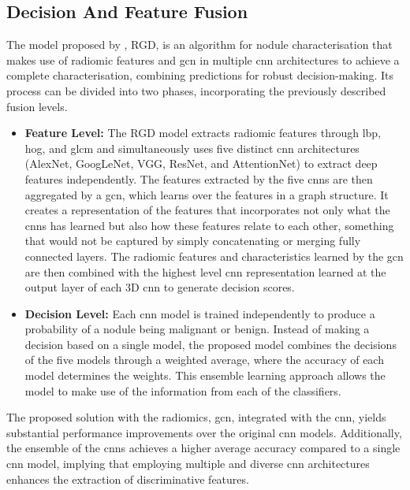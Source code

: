 \subsection{Decision And Feature Fusion}

The model proposed by \textcite{ma_novel_2023}, RGD, is an algorithm for nodule characterisation that makes use of radiomic features and \ac{gcn} in multiple \ac{cnn} architectures to achieve a complete characterisation, combining predictions for robust decision-making.
Its process can be divided into two phases, incorporating the previously described fusion levels.
\begin{itemize}
    \item \textbf{Feature Level:} The RGD model extracts radiomic features through \ac{lbp}, \ac{hog}, and \ac{glcm} and simultaneously uses five distinct \ac{cnn} architectures (AlexNet, GoogLeNet, VGG, ResNet, and AttentionNet) to extract deep features independently.
        The features extracted by the five \acp{cnn} are then aggregated by a  \ac{gcn}, which learns over the features in a graph structure. It creates a representation of the features that incorporates not only what the \acp{cnn} has learned but also how these features relate to each other, something that would not be captured by simply concatenating or merging fully connected layers.
    The radiomic features and characteristics learned by the \ac{gcn} are then combined with the highest level \ac{cnn} representation learned at the output layer of each 3D \ac{cnn} to generate decision scores. 
    
    \item \textbf{Decision Level:} Each \ac{cnn} model is trained independently to produce a probability of a nodule being malignant or benign.
    Instead of making a decision based on a single model, the proposed model combines the decisions of the five models through a weighted average, where the accuracy of each model determines the weights. This ensemble learning approach allows the model to make use of the information from each of the classifiers.
\end{itemize}

    The proposed solution with the radiomics, \ac{gcn}, integrated with the \ac{cnn}, yields substantial performance improvements over the original \ac{cnn} models. Additionally, the ensemble of the \acp{cnn} achieves a higher average accuracy compared to a single \ac{cnn} model, implying that employing multiple and diverse \ac{cnn} architectures enhances the extraction of discriminative features.

